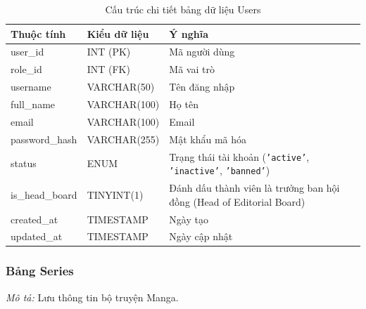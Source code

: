 \begin{table}[H]
\centering
\renewcommand{\arraystretch}{1.3}
\begin{tabularx}{\textwidth}{|p{4cm}|p{3cm}|>{\raggedright\arraybackslash}X|}
\hline
\rowcolor{tableheader}
\textbf{Thuộc tính} & \textbf{Kiểu dữ liệu} & \textbf{Ý nghĩa} \\ \hline
user\_id & INT (PK) & Mã người dùng \\ \hline
role\_id & INT (FK) & Mã vai trò \\ \hline
username & VARCHAR(50) & Tên đăng nhập \\ \hline
full\_name & VARCHAR(100) & Họ tên \\ \hline
email & VARCHAR(100) & Email \\ \hline
password\_hash & VARCHAR(255) & Mật khẩu mã hóa \\ \hline
status & ENUM & Trạng thái tài khoản (\texttt{'active'}, \texttt{'inactive'}, \texttt{'banned'}) \\ \hline
is\_head\_board & TINYINT(1) & Đánh dấu thành viên là trưởng ban hội đồng (Head of Editorial Board) \\ \hline
created\_at & TIMESTAMP & Ngày tạo \\ \hline
updated\_at & TIMESTAMP & Ngày cập nhật \\ \hline
\end{tabularx}
\caption{Cấu trúc chi tiết bảng dữ liệu Users}
\label{tab:db_users}
\end{table}

\subsubsection{Bảng Series}
\label{subsubsec:tbl_series}
\textit{Mô tả:} Lưu thông tin bộ truyện Manga.

